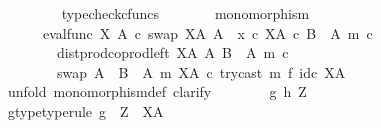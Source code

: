 \begin{isabellebody}
\ \ \ \ \ \ \isamarkupfalse%
\ \ typecheck{\isacharunderscore}{\kern0pt}cfuncs\isanewline
\ \ \ \ \isamarkupfalse%
\ \isamarkupfalse%
\ {\isachardoublequoteopen}monomorphism\isanewline
\ \ \ \ \ \ {\isacharparenleft}{\kern0pt}{\isacharparenleft}{\kern0pt}{\isacharparenleft}{\kern0pt}eval{\isacharunderscore}{\kern0pt}func\ X\ A\ {\isasymcirc}\isactrlsub c\ swap\ {\isacharparenleft}{\kern0pt}X\isactrlbsup A\isactrlesup {\isacharparenright}{\kern0pt}\ A{\isacharparenright}{\kern0pt}\ {\isasymamalg}\ {\isacharparenleft}{\kern0pt}x\ {\isasymcirc}\isactrlsub c\ {\isasymbeta}\isactrlbsub X\isactrlbsup A\isactrlesup \ {\isasymtimes}\isactrlsub c\ {\isacharparenleft}{\kern0pt}B\ {\isasymsetminus}\ {\isacharparenleft}{\kern0pt}A{\isacharcomma}{\kern0pt}\ m{\isacharparenright}{\kern0pt}{\isacharparenright}{\kern0pt}\isactrlesub {\isacharparenright}{\kern0pt}\ {\isasymcirc}\isactrlsub c\isanewline
\ \ \ \ \ \ \ \ dist{\isacharunderscore}{\kern0pt}prod{\isacharunderscore}{\kern0pt}coprod{\isacharunderscore}{\kern0pt}left\ {\isacharparenleft}{\kern0pt}X\isactrlbsup A\isactrlesup {\isacharparenright}{\kern0pt}\ A\ {\isacharparenleft}{\kern0pt}B\ {\isasymsetminus}\ {\isacharparenleft}{\kern0pt}A{\isacharcomma}{\kern0pt}\ m{\isacharparenright}{\kern0pt}{\isacharparenright}{\kern0pt}\ {\isasymcirc}\isactrlsub c\isanewline
\ \ \ \ \ \ \ \ swap\ {\isacharparenleft}{\kern0pt}A\ {\isasymCoprod}\ {\isacharparenleft}{\kern0pt}B\ {\isasymsetminus}\ {\isacharparenleft}{\kern0pt}A{\isacharcomma}{\kern0pt}\ m{\isacharparenright}{\kern0pt}{\isacharparenright}{\kern0pt}{\isacharparenright}{\kern0pt}\ {\isacharparenleft}{\kern0pt}X\isactrlbsup A\isactrlesup {\isacharparenright}{\kern0pt}\ {\isasymcirc}\isactrlsub c\ try{\isacharunderscore}{\kern0pt}cast\ m\ {\isasymtimes}\isactrlsub f\ id\isactrlsub c\ {\isacharparenleft}{\kern0pt}X\isactrlbsup A\isactrlesup {\isacharparenright}{\kern0pt}{\isacharparenright}{\kern0pt}\isactrlsup {\isasymsharp}{\isacharparenright}{\kern0pt}{\isachardoublequoteclose}\isanewline
\ \ \ \ \isamarkupfalse%
\ {\isacharparenleft}{\kern0pt}unfold\ monomorphism{\isacharunderscore}{\kern0pt}def{}{\isacharcomma}{\kern0pt}\ clarify{\isacharparenright}{\kern0pt}\isanewline
\ \ \ \ \ \ \isamarkupfalse%
\ g\ h\ Z\isanewline
\ \ \ \ \ \ \isamarkupfalse%
\ g{\isacharunderscore}{\kern0pt}type{\isacharbrackleft}{\kern0pt}type{\isacharunderscore}{\kern0pt}rule{\isacharbrackright}{\kern0pt}{\isacharcolon}{\kern0pt}\ {\isachardoublequoteopen}g\ {\isacharcolon}{\kern0pt}\ Z\ {\isasymrightarrow}\ X\isactrlbsup A\isactrlesup {\isachardoublequoteclose}\isanewline

\end{isabellebody}
